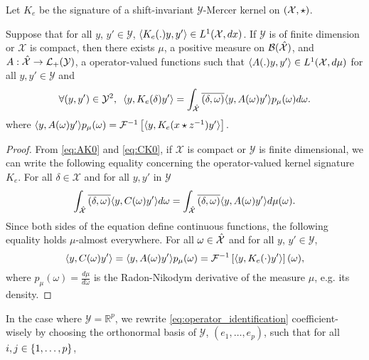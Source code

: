 \begin{proposition}
\label{pr:spectral}
Let $K_e$ be the signature of a shift-invariant $\mathcal{Y}$-Mercer kernel on $(\mathcal{X}, \star)$.

Suppose that for all $y$, $y' \in\mathcal{Y}$, $\langle K_e(.)y,y'\rangle\in L^1(\mathcal{X},dx)$. If $\mathcal{Y}$ is of finite dimension or $\mathcal{X}$ is compact, then there exists $\mu$, a positive measure on $\mathcal{B}(\mathcal{\hat{\mathcal{X}}})$, and $A:\hat{\mathcal{X}}\to \mathcal{L}_+(\mathcal{Y})$, a operator-valued functions such that $\langle A(.)y,y'\rangle\in L^1(\mathcal{X},d\mu)$ for all $y,y'\in\mathcal{Y}$ and
\begin{equation*}
\forall (y,y')\in\mathcal{Y}^2, \enskip \langle y, K_e(\delta)y'\rangle=\int_{\hat{\mathcal{X}}}\overline{(\delta, \omega)}\langle y, A(\omega)y'\rangle p_{\mu}(\omega)d\omega.
\end{equation*}
where $\langle y, A(\omega)y'\rangle p_{\mu}(\omega) = \mathcal{F}^{-1}\left[\langle y, K_e(x\star {z}^{-1})y'\rangle\right]$.
\end{proposition}
\begin{proof}
From \cref{eq:AK0} and \cref{eq:CK0}, if $\mathcal{X}$ is compact or $\mathcal{Y}$ is finite dimensional, we can write the following equality concerning the operator-valued kernel signature $K_e$. For all $\delta \in \mathcal{X}$ and for all $y, y'$ in $\mathcal{Y}$
\begin{equation*}
\int_{\hat{\mathcal{X}}}\overline{(\delta, \omega)}\langle y, C(\omega)y'\rangle d\omega=\int_{\hat{\mathcal{X}}}\overline{(\delta, \omega)}\langle y, A(\omega)y'\rangle d\mu(\omega).
\end{equation*} %
Since both sides of the equation define continuous functions, the following equality holds $\mu$-almost everywhere. For all $\omega \in \hat{\mathcal{X}}$ and for all $y$, $y'\in\mathcal{Y}$,
\begin{equation}
\label{eq:operator_identification}
\langle y, C(\omega)y'\rangle=\langle y, A(\omega)y'\rangle p_{\mu}(\omega)=\mathcal{F}^{-1}\left[\langle y, K_e(\cdot)y'\rangle\right](\omega),
\end{equation}
where $p_{\mu}(\omega)=\frac{d\mu}{d\omega}$ is the Radon-Nikodym derivative of the measure $\mu$, e.g. its density. 
\end{proof}
In the case where $\mathcal{Y}=\mathbb{R}^p$, we rewrite \cref{eq:operator_identification} coefficient-wisely by choosing the orthonormal basis of $\mathcal{Y}$, $(e_1,\ldots, e_p)$, such that for all $ i,j\in {\left\{1, \ldots, p\right\}}$,
